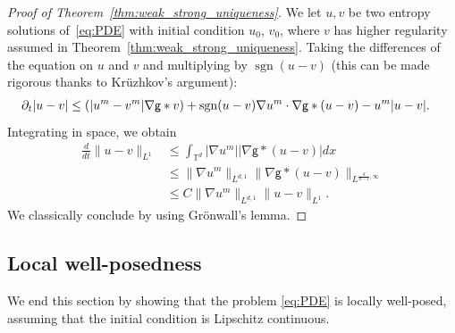 \documentclass[11pt]{article}
\numberwithin{equation}{section} %
\DeclareMathOperator{\sgn}{sgn}
\newcommand{\p}{{\partial}}
\newcommand{\T}{{\mathbb{T}}}
\newcommand{\g}{{\mathsf{g}}}
\let\div\relax
\DeclareMathOperator{\div}{\mathsf{div}}
\def\nab{\nabla}
\begin{document}
\begin{proof}[Proof of Theorem~\ref{thm:weak_strong_uniqueness}] 

We let $u,v$ be two entropy solutions of~\eqref{eq:PDE} with initial condition $u_0$, $v_0$, where $v$ has higher regularity assumed in Theorem~\ref{thm:weak_strong_uniqueness}. Taking the differences of the equation on $u$ and $v$ and multiplying by $\sgn(u-v)$ (this can be made rigorous thanks to Kr\"uzhkov's argument): 
\begin{align*}
    \p_t |u- v| &\le \div(|u^m-v^m|\nab\g\ast v)  
    +\sgn (u-v)\nab u^m\cdot\nab\g\ast (u-v) - u^m |u-v|.
\end{align*}
Integrating in space, we obtain
\begin{align*}
    \frac{d}{dt}\| u-v\|_{L^1} &\le \int_{\T^d} |\nab u^m||\nab\g\ast (u-v)|dx \\
    &\le \|\nab u^m\|_{L^{d,1}}\|\nab\g\ast (u-v)\|_{L^{\frac{d}{d-1},\infty}} \\
    &\le  C\|\nab u^m\|_{L^{d,1}}\| u-v\|_{L^1}.
\end{align*}
We classically conclude by using Gr\"onwall's lemma.

\end{proof}



\subsection{Local well-posedness}

We end this section by showing that the problem \eqref{eq:PDE} is locally well-posed, assuming that the initial condition is Lipschitz continuous. 
\end{document}
